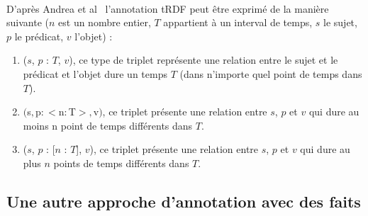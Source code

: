 \documentclass[12pt,a4	]{report}
\begin{document}
\paragraph{}
D'après Andrea et al~\cite{pugliese2008} l’annotation tRDF peut être exprimé de la manière suivante ($n$ est un nombre entier, $T$ appartient à un interval de temps, $s$ le sujet, $p$ le prédicat, $v$ l'objet) :
\begin{enumerate}
\item ($s$, $p$ : {$T$}, $v$), ce type de triplet représente une relation entre le sujet et le prédicat et l'objet dure un temps $T$ (dans n'importe quel point de temps dans $T$).
\item $($s$, $p$ : <$n$ : $T$>, $v$)$, ce triplet présente une relation entre $s$, $p$ et $v$ qui dure au moins n point de temps différents dans $T$.
\item ($s$, $p$ : [$n$ : $T$], $v$), ce triplet présente une relation entre $s$, $p$ et $v$ qui dure au plus $n$ points de temps différents dans $T$. 
\end{enumerate}
\subsection*{Une autre approche d'annotation avec des faits}
\end{document}
